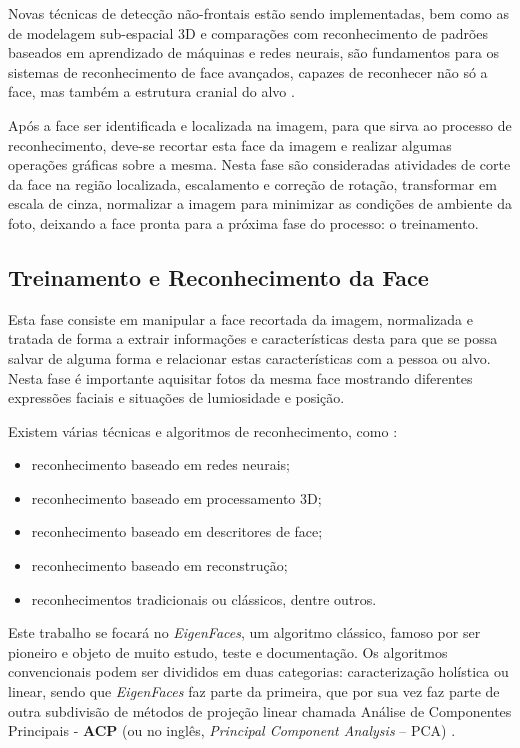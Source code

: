 Novas técnicas de detecção não-frontais estão sendo implementadas, bem como as de modelagem sub-espacial 3D e comparações com reconhecimento de padrões baseados em aprendizado de máquinas e redes neurais, são fundamentos para os sistemas de reconhecimento de face avançados, capazes de reconhecer não só a face, mas também a estrutura cranial do alvo \cite{3dmodel_fd}. 

Após a face ser identificada e localizada na imagem, para que sirva ao processo de reconhecimento, deve-se recortar esta face da imagem e realizar algumas operações gráficas sobre a mesma. Nesta fase são consideradas atividades de corte da face na região localizada, escalamento e correção de rotação, transformar em escala de cinza, normalizar a imagem para minimizar as condições de ambiente da foto, deixando a face pronta para a próxima fase do processo: o treinamento.


\subsection{Treinamento e Reconhecimento da Face} \label{subsec:treinrecface}

Esta fase consiste em manipular a face recortada da imagem, normalizada e tratada de forma a extrair informações e características desta para que se possa salvar de alguma forma e relacionar estas características com a pessoa ou alvo. Nesta fase é importante aquisitar fotos da mesma face mostrando diferentes expressões faciais e situações de lumiosidade e posição.

Existem várias técnicas e algoritmos de reconhecimento, como \cite{issues_methods_FR}:

\begin{itemize}
	\item reconhecimento baseado em redes neurais;
	\item reconhecimento baseado em processamento 3D;
	\item reconhecimento baseado em descritores de face;
	\item reconhecimento baseado em reconstrução;
	\item reconhecimentos tradicionais ou clássicos, dentre outros.
\end{itemize}

Este trabalho se focará no \textit{EigenFaces}, um algoritmo clássico, famoso por ser pioneiro e objeto de muito estudo, teste e documentação. Os algoritmos convencionais podem ser divididos em duas categorias: caracterização holística ou linear, sendo que \textit{EigenFaces} faz parte da primeira, que por sua vez faz parte de outra subdivisão de métodos de projeção linear chamada Análise de Componentes Principais - \textbf{ACP} (ou no inglês, \textit{Principal Component Analysis} – PCA) \cite{issues_methods_FR}.

